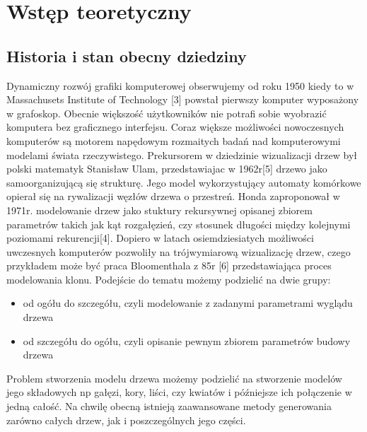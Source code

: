 \chapter{Wstęp teoretyczny}



\section{Historia i stan obecny dziedziny}
Dynamiczny rozwój grafiki komputerowej obserwujemy od roku 1950 kiedy to w Massachusets Institute of Technology [3] powstał pierwszy
komputer wyposażony w grafoskop. Obecnie większość użytkowników nie potrafi sobie wyobrazić komputera bez graficznego interfejsu.
Coraz większe możliwości nowoczesnych komputerów są motorem napędowym rozmaitych badań nad komputerowymi modelami świata rzeczywistego.
Prekursorem w dziedzinie wizualizacji drzew był polski matematyk Stanisław Ulam, przedstawiajac w 1962r[5] drzewo jako samoorganizującą się
strukturę. Jego model wykorzystujący automaty komórkowe opierał się na rywalizacji węzłów  drzewa o przestreń.
Honda zaproponował w 1971r. modelowanie drzew jako stuktury rekursywnej opisanej
zbiorem parametrów takich jak kąt rozgałęzień, czy stosunek długości między kolejnymi poziomami rekurencji[4]. Dopiero w latach osiemdziesiatych
możliwości uwczesnych komputerów pozwoliły na trójwymiarową wizualizację drzew, czego przykładem może być praca Bloomenthala z 85r [6]
przedstawiająca proces modelowania klonu. Podejście do tematu możemy podzielić na dwie grupy:
\begin{itemize}
\item od ogółu do szczegółu, czyli modelowanie z zadanymi parametrami wyglądu drzewa
\item od szczegółu do ogółu, czyli opisanie pewnym zbiorem parametrów budowy drzewa
\end{itemize}
Problem stworzenia modelu drzewa możemy podzielić na stworzenie modelów jego składowych np gałęzi, kory, liści, czy kwiatów i późniejsze
ich połączenie w jedną całość. Na chwilę obecną istnieją zaawansowane metody generowania zarówno całych drzew, jak i poszczególnych jego części.

